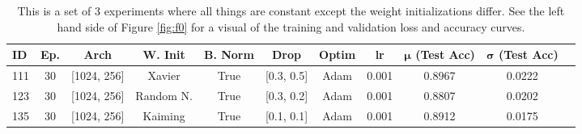 \documentclass[11pt]{amsart}
\begin{document}

\begin{table}[h]
    \centering
    \begin{tabular}{|l|c|c|c|c|c|c|c|c|c|c|} %
        \hline
        \textbf{ID} & \textbf{Ep.}
        & \textbf{Arch} & \textbf{W. Init}
        & \textbf{B. Norm} & \textbf{Drop}
        & \textbf{Optim} & \textbf{lr}
	& \textbf{$\bm \mu$ (Test Acc)}
        & \textbf{$\bm \sigma$ (Test Acc)} \\ 
        \hline
        111 & 30 & [1024, 256]  & Xavier 		& True & [0.3, 0.5] & Adam & 0.001 & 0.8967 & 0.0222 \\
        \hline
        123 & 30 & [1024, 256]  & Random N. 	& True & [0.3, 0.2] & Adam & 0.001 & 0.8807 & 0.0202 \\
        \hline
        135 & 30 & [1024, 256]  & Kaiming 		& True & [0.1, 0.1] & Adam & 0.001 & 0.8912 & 0.0175 \\  
        \hline
    \end{tabular}
    \caption{This is a set of 3 experiments where all things are constant except the weight initializations differ.
    See the left hand side of Figure \ref{fig:f0} for a visual of the training and validation loss and accuracy curves.}
    \label{tab:tab0}
\end{table}
\end{document}

